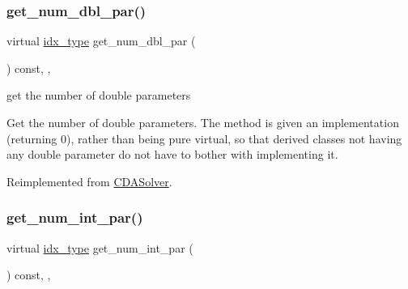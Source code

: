 \subsubsection{\texorpdfstring{get\+\_\+num\+\_\+dbl\+\_\+par()}{get\_num\_dbl\_par()}}
{\footnotesize\ttfamily virtual \mbox{\hyperlink{class_s_m_spp__di__unipi__it_1_1_thin_compute_interface_aa3d710629ad8c434286726ad810c3b47}{idx\+\_\+type}} get\+\_\+num\+\_\+dbl\+\_\+par (\begin{DoxyParamCaption}\item[{void}]{ }\end{DoxyParamCaption}) const\hspace{0.3cm}{\ttfamily [inline]}, {\ttfamily [override]}, {\ttfamily [virtual]}}



get the number of double parameters 

Get the number of double parameters. The method is given an implementation (returning 0), rather than being pure virtual, so that derived classes not having any double parameter do not have to bother with implementing it. 

Reimplemented from \mbox{\hyperlink{class_s_m_spp__di__unipi__it_1_1_c_d_a_solver_a842fd454acaded84baf6b77e0d61a950}{C\+D\+A\+Solver}}.

\mbox{\label{class_s_m_spp__di__unipi__it_1_1_m_c_f_solver_a3ad74d9506761eb2ca4c8a936fb7a1c5}} 
\subsubsection{\texorpdfstring{get\+\_\+num\+\_\+int\+\_\+par()}{get\_num\_int\_par()}}
{\footnotesize\ttfamily virtual \mbox{\hyperlink{class_s_m_spp__di__unipi__it_1_1_thin_compute_interface_aa3d710629ad8c434286726ad810c3b47}{idx\+\_\+type}} get\+\_\+num\+\_\+int\+\_\+par (\begin{DoxyParamCaption}\item[{void}]{ }\end{DoxyParamCaption}) const\hspace{0.3cm}{\ttfamily [inline]}, {\ttfamily [override]}, {\ttfamily [virtual]}}



